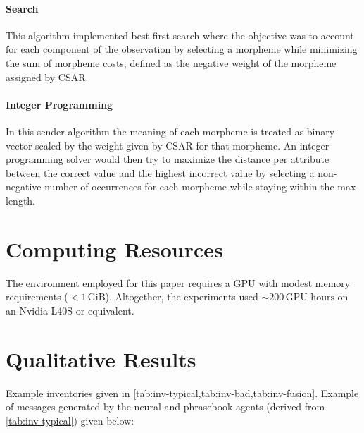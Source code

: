 \paragraph{Search}
This algorithm implemented best-first search where the objective was to account for each component of the observation by selecting a morpheme while minimizing the sum of morpheme costs, defined as the negative weight of the morpheme assigned by CSAR\@.

\paragraph{Integer Programming}
In this sender algorithm the meaning of each morpheme is treated as binary vector scaled by the weight given by CSAR for that morpheme.
An integer programming solver would then try to maximize the distance per attribute between the correct value and the highest incorrect value by selecting a non-negative number of occurrences for each morpheme while staying within the max length.

\section{Computing Resources}%
\label{app:compute}
The environment employed for this paper requires a GPU with modest memory requirements (${<}1\,\text{GiB}$).
Altogether, the experiments used ${\sim}200\,\text{GPU-hours}$ on an Nvidia L40S or equivalent.

\section{Qualitative Results}%
\label{app:qual}
Example inventories given in \cref{tab:inv-typical,tab:inv-bad,tab:inv-fusion}.
Example of messages generated by the neural and phrasebook agents (derived from \cref{tab:inv-typical}) given below:


\begin{table}
  \centering
  \caption{A typical morpheme inventory.}%
  \label{tab:inv-typical}
\end{table}

\begin{table}
  \centering
  \caption{An outlier inventory with very poor performance.}%
  \label{tab:inv-bad}
\end{table}

